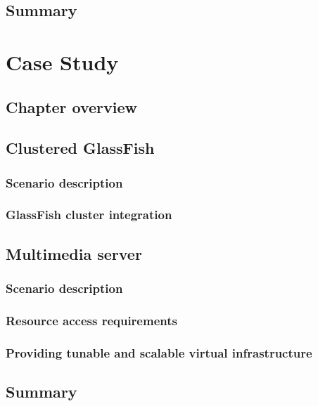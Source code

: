 \documentclass[11pt]{book}
\begin{document}
    \section*{Summary}


  \chapter{Case Study}

    \section*{Chapter overview}

    \section{Clustered GlassFish}

      \subsection{Scenario description}

      \subsection{GlassFish cluster integration}


    \section{Multimedia server}

      \subsection{Scenario description}

      \subsection{Resource access requirements}

      \subsection{Providing tunable and scalable virtual infrastructure}


    \section*{Summary}
\end{document}
